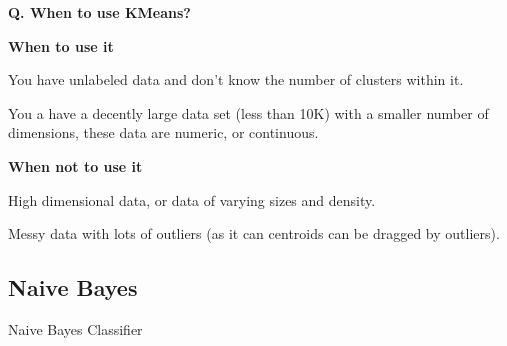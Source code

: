 \begin{frame}[fragile]{\textbf{Q. When to use KMeans?}}
  \vspace{.4em}
  \begin{wideitemize}
    \item \textbf{When to use it}
    \begin{wideitemize}
      \item You have unlabeled data and don't know the number of clusters within it.
      \item You a have a decently large data set (less than 10K) with
      a smaller number of dimensions, these data are numeric, or continuous.
    \end{wideitemize}
    \item \textbf{When not to use it}
    \begin{wideitemize}
      \item High dimensional data, or data of varying sizes and density.
      \item Messy data with lots of outliers (as it can centroids can be dragged by outliers).
    \end{wideitemize}
  \end{wideitemize}
\end{frame}



\subsection{Naive Bayes}
\begin{transitionsubframe}
  \begin{center}
    \Huge Naive Bayes Classifier
  \end{center}
\end{transitionsubframe}



